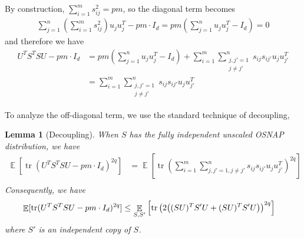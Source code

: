 \documentclass[11pt]{amsart}
\numberwithin{equation}{section}
\numberwithin{equation}{section}
\DeclareMathOperator{\E}{\mathbb{E}}
\DeclareMathOperator*{\tr}{tr}
\DeclarePairedDelimiter{\paren}{(}{)}
\newtheorem{lemma}[theorem]{Lemma}
\theoremstyle{remark}
\theoremstyle{definition}
\begin{document}
By construction, $\sum_{i=1}^m s_{ij}^2 = pm$, so the diagonal term becomes
\begin{align*}
        \sum_{j=1}^n \left( \sum_{i=1}^m s_{ij}^2 \right) u_ju_j^T  - pm\cdot I_d=pm \left( \sum_{j=1}^n u_ju_j^T  - I_d \right)=0
    \end{align*}
and therefore we have
\begin{align*}
    U^TS^TSU - pm\cdot I_d &=  pm \left( \sum_{j=1}^n u_ju_j^T  - I_d \right) + \sum_{i=1}^m \sum_{\substack{j,j' =1 \\ j \neq j'}}^n s_{ij}s_{ij'} u_ju_{j'}^T \\
    &= \sum_{i=1}^m \sum_{\substack{j,j' =1 \\ j \neq j'}}^n s_{ij}s_{ij'} u_ju_{j'}^T
\end{align*}

To analyze the off-diagonal term, we use the standard technique of decoupling, 



\begin{lemma}[Decoupling] \label{lem:decoup}
When $S$ has the fully independent unscaled OSNAP distribution, we have
\begin{align*}
    \E [ \tr (U^TS^TSU - pm\cdot I_d)^{2q} ] &= \E \left[ \tr \left( \sum_{i=1}^m \sum_{j,j' =1, j \neq j'}^n s_{ij}s_{ij'} u_ju_{j'}^T \right)^{2q} \right] \\
\end{align*}
Consequently, we have
\begin{align*}
    \E [ \tr (U^TS^TSU - pm\cdot I_d)^{2q} ] &\le \E_{S,S'} \left[ \tr \left(  2\paren*{(SU)^TS'U + (SU)^TS'U} \right)^{2q} \right]
\end{align*}
where $S'$ is an independent copy of $S$.
\end{lemma}
\end{document}
